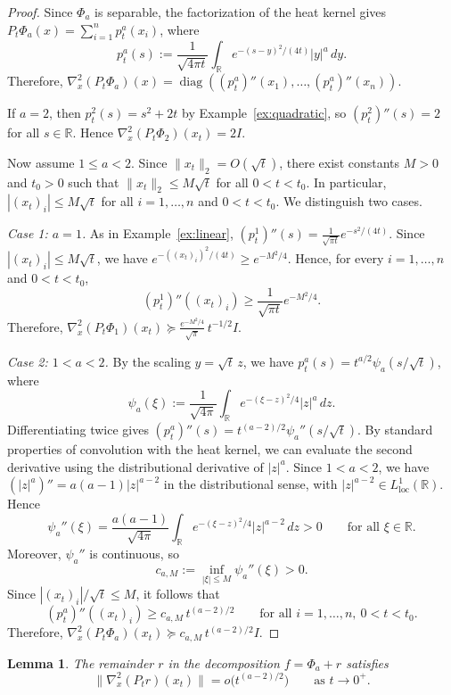 \documentclass{article}
\newtheorem{lemma}[lemma]{Lemma}
\begin{document}
\begin{proof}
Since $\Phi_a$ is separable, the factorization of the heat kernel gives $P_t\Phi_a(x)=\sum_{i=1}^n p_t^a(x_i)$, where
$$p_t^a(s):=\frac{1}{\sqrt{4\pi t}}\int_{\mathbb R} e^{-(s-y)^2/(4t)}|y|^a\,dy.$$
Therefore, $\nabla_x^2(P_t\Phi_a)(x)=\operatorname{diag}((p_t^a)''(x_1),\dots,(p_t^a)''(x_n))$.

If $a=2$, then $p_t^2(s)=s^2+2t$ by Example~\ref{ex:quadratic}, so $(p_t^2)''(s)=2$ for all $s\in\mathbb R$. Hence $\nabla_x^2(P_t\Phi_2)(x_t)=2I$.

Now assume $1\le a<2$. Since $\|x_t\|_2=O(\sqrt t)$, there exist constants $M>0$ and $t_0>0$ such that $\|x_t\|_2\le M\sqrt t$ for all $0<t<t_0$. In particular, $|(x_t)_i|\le M\sqrt t$ for all $i=1,\dots,n$ and $0<t<t_0$. We distinguish two cases.

\emph{Case 1: $a=1$.} As in Example~\ref{ex:linear}, $(p_t^1)''(s)=\frac{1}{\sqrt{\pi t}}e^{-s^2/(4t)}$. Since $|(x_t)_i|\le M\sqrt t$, we have $e^{-((x_t)_i)^2/(4t)} \ge e^{-M^2/4}$. Hence, for every $i=1,\dots,n$ and $0<t<t_0$,
$$(p_t^1)''((x_t)_i)\ge \frac{1}{\sqrt{\pi t}}e^{-M^2/4}.$$
Therefore, $\nabla_x^2(P_t\Phi_1)(x_t)\succeq \frac{e^{-M^2/4}}{\sqrt\pi}\,t^{-1/2}I$.

\emph{Case 2: $1<a<2$.} By the scaling $y=\sqrt t\,z$, we have $p_t^a(s)=t^{a/2}\psi_a(s/\sqrt t)$, where
$$\psi_a(\xi):=\frac{1}{\sqrt{4\pi}}\int_{\mathbb R} e^{-(\xi-z)^2/4}|z|^a\,dz.$$
Differentiating twice gives $(p_t^a)''(s)=t^{(a-2)/2}\psi_a''(s/\sqrt t)$. By standard properties of convolution with the heat kernel, we can evaluate the second derivative using the distributional derivative of $|z|^a$. Since $1<a<2$, we have $(|z|^a)''=a(a-1)|z|^{a-2}$ in the distributional sense, with $|z|^{a-2}\in L^1_{\mathrm{loc}}(\mathbb R)$. Hence
$$\psi_a''(\xi)=\frac{a(a-1)}{\sqrt{4\pi}}\int_{\mathbb R} e^{-(\xi-z)^2/4}|z|^{a-2}\,dz>0 \qquad \text{for all }\xi\in\mathbb R.$$
Moreover, $\psi_a''$ is continuous, so
$$c_{a,M}:=\inf_{|\xi|\le M}\psi_a''(\xi)>0.$$
Since $|(x_t)_i|/\sqrt t\le M$, it follows that
$$(p_t^a)''((x_t)_i)\ge c_{a,M}\,t^{(a-2)/2}\qquad \text{for all }i=1,\dots,n,\ 0<t<t_0.$$
Therefore, $\nabla_x^2(P_t\Phi_a)(x_t)\succeq c_{a,M}\,t^{(a-2)/2}I$.
\end{proof}

\begin{lemma}\label{lem:remainder-hessian-small}
The remainder $r$ in the decomposition $f=\Phi_a+r$ satisfies
$$\|\nabla_x^2(P_t r)(x_t)\|=o\bigl(t^{(a-2)/2}\bigr)\qquad\text{as }t\to0^+.$$
\end{lemma}
\end{document}
